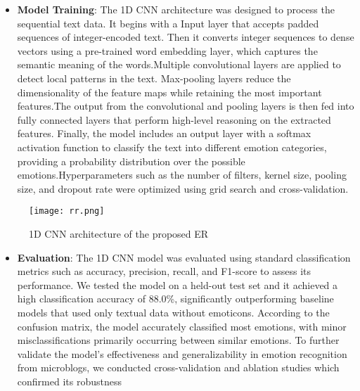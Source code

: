 \documentclass[12pt]{article} %
\begin{document}
\begin{itemize}
    \item \textbf{Model Training}:
    The 1D CNN architecture was designed to process the sequential text data. It begins with a Input layer that accepts padded sequences of integer-encoded text. Then it converts integer sequences to dense vectors using a pre-trained word embedding layer, which captures the semantic meaning of the words.Multiple convolutional layers are applied to detect local patterns in the text. Max-pooling layers reduce the dimensionality of the feature maps while retaining the most important features.The output from the convolutional and pooling layers is then fed into fully connected layers that perform high-level reasoning on the extracted features. Finally, the model includes an output layer with a softmax activation function to classify the text into different emotion categories, providing a probability distribution over the possible emotions.Hyperparameters such as the number of filters, kernel size, pooling size, and dropout rate were optimized using grid search and cross-validation.             
  
\end{itemize}

    \begin{figure}[h!]
    \centering
    \texttt{[image: rr.png]}                    
    \caption{1D CNN architecture of the proposed ER }                              
    \label{1D CNN architecture of the proposed ER }
    \end{figure}                    
                    
                    
\begin{itemize}
    \item \textbf{Evaluation}:
    The 1D CNN model was evaluated using standard classification metrics such as accuracy, precision, recall, and F1-score to assess its performance. We tested the model on a held-out test set and it achieved a high classification accuracy of 88.0\%, significantly outperforming baseline models that used only textual data without emoticons. According to the confusion matrix, the model accurately classified most emotions, with minor misclassifications primarily occurring between similar emotions. To further validate the model's effectiveness and generalizability in emotion recognition from microblogs, we conducted cross-validation and ablation studies which confirmed its robustness                                        
  
\end{itemize}  
\newpage
\end{document}
